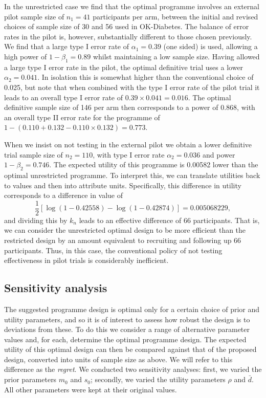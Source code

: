 \documentclass[sagev, Crown]{sagej} %
\begin{document}
In the unrestricted case we find that the optimal programme involves an external pilot sample size of $n_1 = 41$ participants per arm, between the initial and revised choices of sample size of 30 and 56 used in OK-Diabetes. The balance of error rates in the pilot is, however, substantially different to those chosen previously. We find that a large type I error rate of $\alpha_1 = 0.39$ (one sided) is used, allowing a high power of $1-\beta_1 = 0.89$ whilst maintaining a low sample size. Having allowed a large type I error rate in the pilot, the optimal definitive trial uses a lower $\alpha_2 = 0.041$. In isolation this is somewhat higher than the conventional choice of 0.025, but note that when combined with the type I error rate of the pilot trial it leads to an overall type I error rate of $0.39 \times 0.041 = 0.016$. The optimal definitive sample size of 146 per arm then corresponds to a power of 0.868, with an overall type II error rate for the programme of $1-(0.110 + 0.132 - 0.110 \times 0.132) = 0.773$.

When we insist on not testing in the external pilot we obtain a lower definitive trial sample size of $n_2 = 110$, with type I error rate $\alpha_2 = 0.036$ and power $1 - \beta_2 = 0.746$. The expected utility of this programme is 0.00582 lower than the optimal unrestricted programme. To interpret this, we can translate utilities back to values and then into attribute units. Specifically, this difference in utility corresponds to a difference in value of
$$
\frac{1}{2}\left[ \log(1-0.42558) - \log(1-0.42874) \right] = 0.005068229,
$$
and dividing this by $k_n$ leads to an effective difference of 66 participants. That is, we can consider the unrestricted optimal design to be more efficient than the restricted design by an amount equivalent to recruiting and following up 66 participants. Thus, in this case, the conventional policy of not testing effectiveness in pilot trials is considerably inefficient.

\subsection{Sensitivity analysis}\label{sec:sensitivity}

The suggested programme design is optimal only for a certain choice of prior and utility parameters, and so it is of interest to assess how robust the design is to deviations from these. To do this we consider a range of alternative parameter values and, for each, determine the optimal programme design. The expected utility of this optimal design can then be compared against that of the proposed design, converted into units of sample size as above. We will refer to this difference as the \emph{regret}. We conducted two sensitivity analyses: first, we varied the prior parameters $m_0$ and $s_0$; secondly, we varied the utility parameters $\rho$ and $\bar{d}$. All other parameters were kept at their original values.
\end{document}
